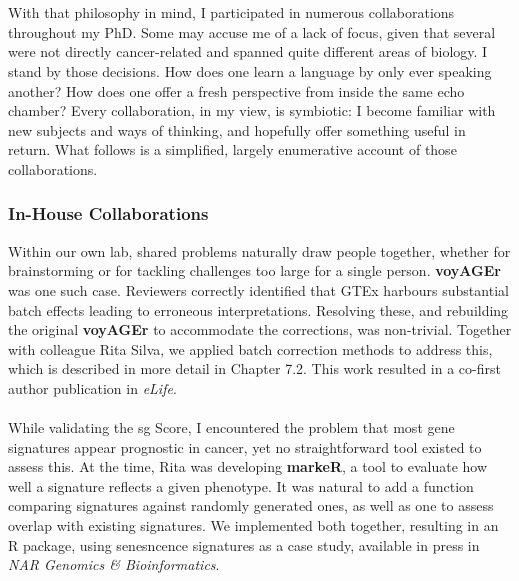 \\
\\
With that philosophy in mind, I participated in numerous collaborations throughout my PhD. Some may accuse me of a lack of focus, given that several were not directly cancer-related and spanned quite different areas of biology. I stand by those decisions. How does one learn a language by only ever speaking another? How does one offer a fresh perspective from inside the same echo chamber? Every collaboration, in my view, is symbiotic: I become familiar with new subjects and ways of thinking, and hopefully offer something useful in return. What follows is a simplified, largely enumerative account of those collaborations.
\subsubsection{In-House Collaborations}
Within our own lab, shared problems naturally draw people together, whether for brainstorming or for tackling challenges too large for a single person.
\textbf{voyAGEr} was one such case. Reviewers correctly identified that GTEx harbours substantial batch effects leading to erroneous interpretations. Resolving these, and rebuilding the original \textbf{voyAGEr} to accommodate the corrections, was non-trivial. Together with colleague Rita Silva, we applied batch correction methods to address this, which is described in more detail in Chapter 7.2. This work resulted in a co-first author publication in \textit{eLife}\cite{schneider_voyager_2024}.
\\
\\
While validating the \gls{sg} Score, I encountered the problem that most gene signatures appear prognostic in cancer, yet no straightforward tool existed to assess this. At the time, Rita was developing \textbf{markeR}, a tool to evaluate how well a signature reflects a given phenotype. It was natural to add a function comparing signatures against randomly generated ones, as well as one to assess overlap with existing signatures. We implemented both together, resulting in an R package, using senesncence signatures as a case study, available in press in \textit{NAR Genomics \& Bioinformatics}\cite{martins-silva_exploring_2025}.
